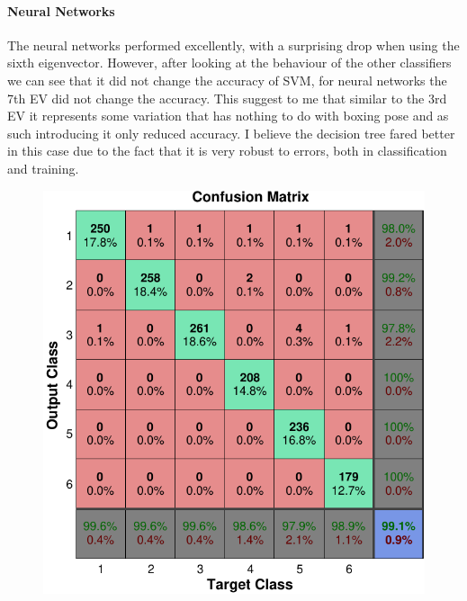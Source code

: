 \paragraph{Neural Networks}
The neural networks performed excellently, with a surprising drop when using the sixth eigenvector. However, after looking at the behaviour of the other classifiers we can see that it did not change the accuracy of SVM, for neural networks the 7th EV did not change the accuracy. This suggest to me that similar to the 3rd EV it represents some variation that has nothing to do with boxing pose and as such introducing it only reduced accuracy. I believe the decision tree fared better in this case due to the fact that it is very robust to errors, both in classification and training.\clearpage

\begin{figure}[h]
    \centering
    \includegraphics[height=0.25\textheight]{fig05/CMtrain-crop.pdf}
    \label{fig:drcomp}
\end{figure}

